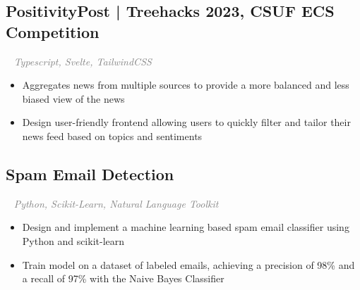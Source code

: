 \documentclass{article}
\newcommand{\resumesection}[3]{
    \subsection*{#1}
    \ 
    \normalsize
    \normalsize
    \hfill
    \textcolor{black}{#3}
    \normalsize
    \newline
    \small
    \textcolor{grey}{\emph{#2}}
}
\begin{document}
\resumesection{PositivityPost | Treehacks 2023, CSUF ECS Competition}{Typescript, Svelte, TailwindCSS}{}
\begin{itemize}
    \item Aggregates news from multiple sources to provide a more balanced and less biased view of the news
    \item Design user-friendly frontend allowing users to quickly filter and tailor their news feed based on topics and sentiments
\end{itemize}

\resumesection{Spam Email Detection}{Python, Scikit-Learn, Natural Language Toolkit}{}
\begin{itemize}
    \item Design and implement a machine learning based spam email classifier using Python and scikit-learn
    \item Train model on a dataset of labeled emails, achieving a precision of 98\% and a recall of 97\% with the Naive Bayes Classifier
\end{itemize}


\end{document}
